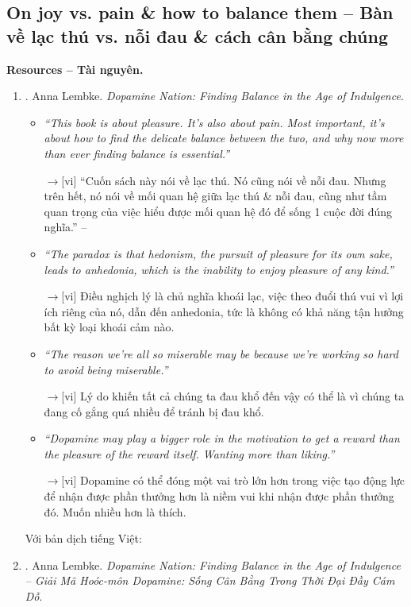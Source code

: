 \documentclass[12pt,oneside]{book}
\begin{document}
\subsection{On joy vs. pain \& how to balance them -- Bàn về lạc thú vs. nỗi đau \& cách cân bằng chúng}
{\bf \textsf{Resources -- Tài nguyên.}}
\begin{enumerate}
	\item \cite{Lembke_dopamine}. {\sc Anna Lembke}. {\it Dopamine Nation: Finding Balance in the Age of Indulgence}.
	\begin{itemize}
		\item {\it``This book is about pleasure. It's also about pain. Most important, it's about how to find the delicate balance between the two, and why now more than ever finding balance is essential.''}
		
		{\sf[en]$\to$[vi]} ``Cuốn sách này nói về lạc thú. Nó cũng nói về nỗi đau. Nhưng trên hết, nó nói về mối quan hệ giữa lạc thú \& nỗi đau, cũng như tầm quan trọng của việc hiểu được mối quan hệ đó để sống 1 cuộc đời đúng nghĩa.'' -- \cite[p. 9]{Lembke_dopamine_VN}
		
		\item {\it``The paradox is that hedonism, the pursuit of pleasure for its own sake, leads to anhedonia, which is the inability to enjoy pleasure of any kind.''}
		
		{\sf[en]$\to$[vi]} Điều nghịch lý là chủ nghĩa khoái lạc, việc theo đuổi thú vui vì lợi ích riêng của nó, dẫn đến anhedonia, tức là không có khả năng tận hưởng bất kỳ loại khoái cảm nào.
		
		\item {\it``The reason we're all so miserable may be because we're working so hard to avoid being miserable.''}
		
		{\sf[en]$\to$[vi]} Lý do khiến tất cả chúng ta đau khổ đến vậy có thể là vì chúng ta đang cố gắng quá nhiều để tránh bị đau khổ.
		
		\item {\it``Dopamine may play a bigger role in the motivation to get a reward than the pleasure of the reward itself. Wanting more than liking.''}
		
		{\sf[en]$\to$[vi]} Dopamine có thể đóng một vai trò lớn hơn trong việc tạo động lực để nhận được phần thưởng hơn là niềm vui khi nhận được phần thưởng đó. Muốn nhiều hơn là thích.
	\end{itemize}
	Với bản dịch tiếng Việt:	
	\item \cite{Lembke_dopamine_VN}. {\sc Anna Lembke}. {\it Dopamine Nation: Finding Balance in the Age of Indulgence -- Giải Mã Hoóc-môn Dopamine: Sống Cân Bằng Trong Thời Đại Đầy Cám Dỗ}.
\end{enumerate}
\end{document}
